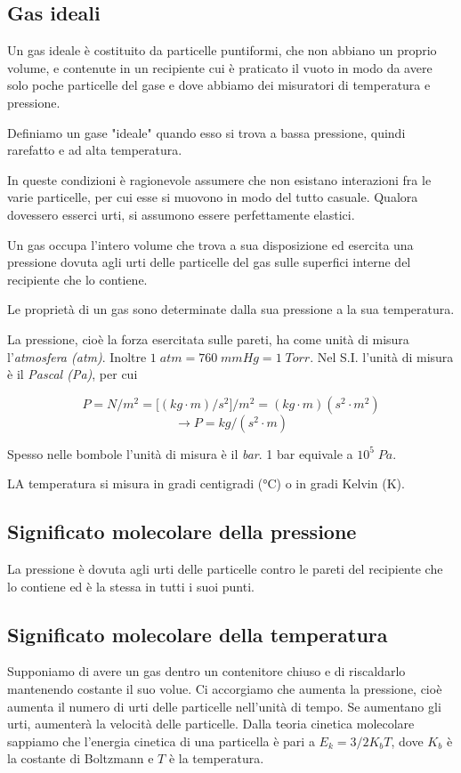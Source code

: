 \subsection{Gas ideali}
Un gas ideale è costituito da particelle puntiformi, che non abbiano un proprio volume, e contenute in un recipiente cui è praticato il vuoto in modo da avere solo poche particelle del gase e dove abbiamo dei misuratori di temperatura e pressione.

Definiamo un gase "ideale" quando esso si trova a bassa pressione, quindi rarefatto e ad alta temperatura.

In queste condizioni è ragionevole assumere che non esistano interazioni fra le varie particelle, per cui esse si muovono in modo del tutto casuale. Qualora dovessero esserci urti, si assumono essere perfettamente elastici.

Un gas occupa l'intero volume che trova a sua disposizione ed esercita una pressione dovuta agli urti delle particelle del gas sulle superfici interne del recipiente che lo contiene.

Le proprietà di un gas sono determinate dalla sua pressione a la sua temperatura.

\vspace{0.2cm}La pressione, cioè la forza esercitata sulle pareti, ha come unità di misura l'\textit{atmosfera (atm)}. Inoltre $1 \; atm=760 \; mmHg=1 \; Torr$. Nel S.I. l'unità di misura è il \textit{Pascal (Pa)}, per cui

$$P=N/m^2=\big[ (kg \cdot m)/s^2 \big]/m^2=(kg \cdot m)(s^2 \cdot m^2)$$
$$\rightarrow P=kg/(s^2 \cdot m)$$

Spesso nelle bombole l'unità di misura è il \textit{bar}. 1 bar equivale a $10^5 \; Pa$.

LA temperatura si misura in gradi centigradi (°C) o in gradi Kelvin (K).
\subsection{Significato molecolare della pressione}
La pressione è dovuta agli urti delle particelle contro le pareti del recipiente che lo contiene ed è la stessa in tutti i suoi punti.
\subsection{Significato molecolare della temperatura}
Supponiamo di avere un gas dentro un contenitore chiuso e di riscaldarlo mantenendo costante il suo volue. Ci accorgiamo che aumenta la pressione, cioè aumenta il numero di urti delle particelle nell'unità di tempo. Se aumentano gli urti, aumenterà la velocità delle particelle. Dalla teoria cinetica molecolare sappiamo che l'energia cinetica di una particella è pari a $E_k=3/2 K_bT$, dove $K_b$ è la costante di Boltzmann e $T$ è la temperatura.

